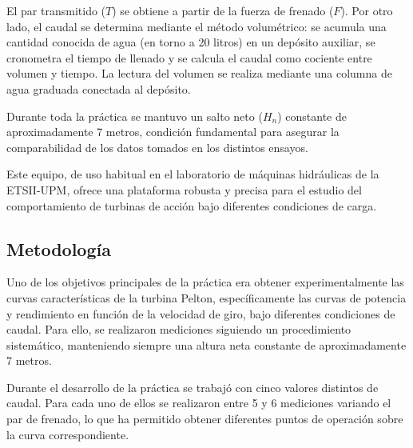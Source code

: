 \documentclass[10pt]{IEEEtran}
\begin{document}
El par transmitido ($T$) se obtiene a partir de la fuerza de frenado ($F$). Por otro lado, el caudal se determina mediante el método volumétrico: se acumula una cantidad conocida de agua (en torno a 20 litros) en un depósito auxiliar, se cronometra el tiempo de llenado y se calcula el caudal como cociente entre volumen y tiempo. La lectura del volumen se realiza mediante una columna de agua graduada conectada al depósito.

Durante toda la práctica se mantuvo un salto neto ($H_n$) constante de aproximadamente 7 metros, condición fundamental para asegurar la comparabilidad de los datos tomados en los distintos ensayos.

Este equipo, de uso habitual en el laboratorio de máquinas hidráulicas de la ETSII-UPM, ofrece una plataforma robusta y precisa para el estudio del comportamiento de turbinas de acción bajo diferentes condiciones de carga.

\subsection{Metodología}
Uno de los objetivos principales de la práctica era obtener experimentalmente las curvas características de la turbina Pelton, específicamente las curvas de potencia y rendimiento en función de la velocidad de giro, bajo diferentes condiciones de caudal. Para ello, se realizaron mediciones siguiendo un procedimiento sistemático, manteniendo siempre una altura neta constante de aproximadamente 7 metros.

Durante el desarrollo de la práctica se trabajó con cinco valores distintos de caudal. Para cada uno de ellos se realizaron entre 5 y 6 mediciones variando el par de frenado, lo que ha permitido obtener diferentes puntos de operación sobre la curva correspondiente.
\end{document}
